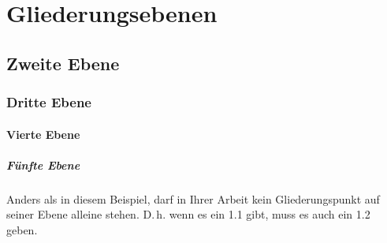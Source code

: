 \chapter{Gliederungsebenen}

\section{Zweite Ebene}

\subsection{Dritte Ebene}

\label{Gliederung:EbeneDrei}


\subsubsection{Vierte Ebene}

\paragraph{Fünfte Ebene} Anders als in diesem Beispiel, darf in Ihrer Arbeit kein Gliederungspunkt auf seiner Ebene alleine stehen. D.\,h. wenn es ein 1.1 gibt, muss es auch ein 1.2 geben.
